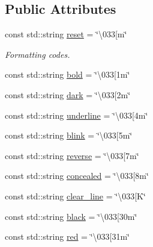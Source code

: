\subsection*{Public Attributes}
\begin{DoxyCompactItemize}
\item 
const std\+::string \hyperlink{classspdlog_1_1sinks_1_1ansicolor__sink_a7a232ef41d85a03d99053ee931fb11a4}{reset} = \char`\"{}\textbackslash{}033\mbox{[}m\char`\"{}
\begin{DoxyCompactList}\small\item\em Formatting codes. \end{DoxyCompactList}\item 
const std\+::string \hyperlink{classspdlog_1_1sinks_1_1ansicolor__sink_ab3b3847f7cfac7e21e5a4300ef0295f0}{bold} = \char`\"{}\textbackslash{}033\mbox{[}1m\char`\"{}
\item 
const std\+::string \hyperlink{classspdlog_1_1sinks_1_1ansicolor__sink_a3802a11d60d725bb27b3a6aaff62bfed}{dark} = \char`\"{}\textbackslash{}033\mbox{[}2m\char`\"{}
\item 
const std\+::string \hyperlink{classspdlog_1_1sinks_1_1ansicolor__sink_a22d86f2cb36da074052308603f058764}{underline} = \char`\"{}\textbackslash{}033\mbox{[}4m\char`\"{}
\item 
const std\+::string \hyperlink{classspdlog_1_1sinks_1_1ansicolor__sink_addca553132fac957295bd585ce6f59a8}{blink} = \char`\"{}\textbackslash{}033\mbox{[}5m\char`\"{}
\item 
const std\+::string \hyperlink{classspdlog_1_1sinks_1_1ansicolor__sink_ac755cd237351fa5cdf4910e491ddbf97}{reverse} = \char`\"{}\textbackslash{}033\mbox{[}7m\char`\"{}
\item 
const std\+::string \hyperlink{classspdlog_1_1sinks_1_1ansicolor__sink_a681736d8ce3d3551bdb51e053a839fc3}{concealed} = \char`\"{}\textbackslash{}033\mbox{[}8m\char`\"{}
\item 
const std\+::string \hyperlink{classspdlog_1_1sinks_1_1ansicolor__sink_aa52fbe671a7c1fbeaf784b8a325745c6}{clear\+\_\+line} = \char`\"{}\textbackslash{}033\mbox{[}K\char`\"{}
\item 
const std\+::string \hyperlink{classspdlog_1_1sinks_1_1ansicolor__sink_afe5bffc4e1d4977d2a351c8772f2f676}{black} = \char`\"{}\textbackslash{}033\mbox{[}30m\char`\"{}
\item 
const std\+::string \hyperlink{classspdlog_1_1sinks_1_1ansicolor__sink_ab5c0ce75c9457f5125a441555287b8d2}{red} = \char`\"{}\textbackslash{}033\mbox{[}31m\char`\"{}
\item 

\end{DoxyCompactItemize}
